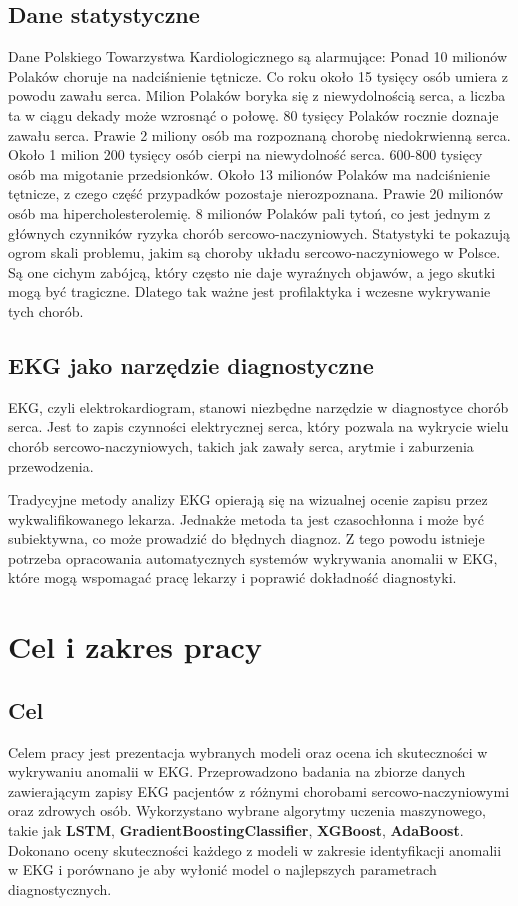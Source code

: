 \documentclass[12pt,a4paper]{article}
\begin{document}
\subsection{Dane statystyczne}
Dane Polskiego Towarzystwa Kardiologicznego \cite{dane-o-problemach-z-sercem} są alarmujące: Ponad 10 milionów Polaków choruje na nadciśnienie tętnicze.
Co roku około 15 tysięcy osób umiera z powodu zawału serca.
Milion Polaków boryka się z niewydolnością serca, a liczba ta w ciągu dekady może wzrosnąć o połowę.
80 tysięcy Polaków rocznie doznaje zawału serca.
Prawie 2 miliony osób ma rozpoznaną chorobę niedokrwienną serca.
Około 1 milion 200 tysięcy osób cierpi na niewydolność serca.
600-800 tysięcy osób ma migotanie przedsionków.
Około 13 milionów Polaków ma nadciśnienie tętnicze, z czego część przypadków pozostaje nierozpoznana.
Prawie 20 milionów osób ma hipercholesterolemię.
8 milionów Polaków pali tytoń, co jest jednym z głównych czynników ryzyka chorób sercowo-naczyniowych.
Statystyki te pokazują ogrom skali problemu, jakim są choroby układu sercowo-naczyniowego w Polsce. Są one cichym zabójcą, który często nie daje wyraźnych objawów, a jego skutki mogą być tragiczne. Dlatego tak ważne jest profilaktyka i wczesne wykrywanie tych chorób. 

\subsection{EKG jako narzędzie diagnostyczne}
EKG, czyli elektrokardiogram, stanowi niezbędne narzędzie w diagnostyce chorób serca. Jest to zapis czynności elektrycznej serca, który pozwala na wykrycie wielu chorób sercowo-naczyniowych, takich jak zawały serca, arytmie i zaburzenia przewodzenia.

Tradycyjne metody analizy EKG opierają się na wizualnej ocenie zapisu przez wykwalifikowanego lekarza. Jednakże metoda ta jest czasochłonna i może być subiektywna, co może prowadzić do błędnych diagnoz. Z tego powodu istnieje potrzeba opracowania automatycznych systemów wykrywania anomalii w EKG, które mogą wspomagać pracę lekarzy i poprawić dokładność diagnostyki.


\section{Cel i zakres pracy}

\subsection{Cel}
Celem pracy jest prezentacja wybranych modeli oraz ocena ich skuteczności w wykrywaniu anomalii w EKG. Przeprowadzono badania na zbiorze danych zawierającym zapisy EKG pacjentów z różnymi chorobami sercowo-naczyniowymi oraz zdrowych osób. Wykorzystano wybrane algorytmy uczenia maszynowego, takie jak \textbf{LSTM}, \textbf{GradientBoostingClassifier}, \textbf{XGBoost}, \textbf{AdaBoost}. Dokonano oceny skuteczności każdego z modeli w zakresie identyfikacji anomalii w EKG i porównano je aby wyłonić model o najlepszych parametrach diagnostycznych. 
\end{document}
